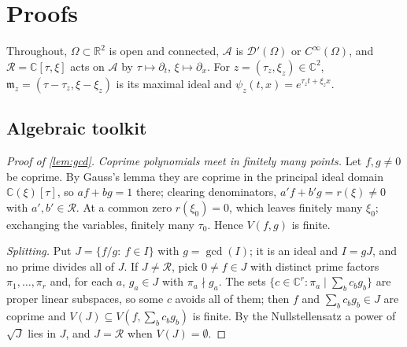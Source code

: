 \documentclass[11pt]{article}
\theoremstyle{plain}
\theoremstyle{definition}
\theoremstyle{remark}
\newcommand{\R}{\mathbb{R}}
\newcommand{\C}{\mathbb{C}}
\newcommand{\ring}{\mathcal{R}}            %
\DeclareMathOperator{\gcdop}{gcd}
\newcommand{\Var}{V}                        %
\begin{document}
\section{Proofs}\label{app:proofs}
Throughout, $\Omega\subset\R^2$ is open and connected, $\mathcal A$ is $\mathcal D'(\Omega)$ or $C^\infty(\Omega)$, and
$\ring=\C[\tau,\xi]$ acts on $\mathcal A$ by $\tau\mapsto\partial_t$, $\xi\mapsto\partial_x$. For $z=(\tau_z,\xi_z)\in\C^2$,
$\mathfrak m_z=(\tau-\tau_z,\xi-\xi_z)$ is its maximal ideal and $\psi_z(t,x)=e^{\tau_zt+\xi_zx}$.

\subsection{Algebraic toolkit}
\begin{proof}[Proof of \cref{lem:gcd}]
\emph{Coprime polynomials meet in finitely many points.} Let $f,g\ne0$ be coprime. By Gauss's lemma they are
coprime in the principal ideal domain $\C(\xi)[\tau]$, so $af+bg=1$ there; clearing denominators,
$a'f+b'g=r(\xi)\ne0$ with $a',b'\in\ring$. At a common zero $r(\xi_0)=0$, which leaves finitely many $\xi_0$;
exchanging the variables, finitely many $\tau_0$. Hence $\Var(f,g)$ is finite.

\emph{Splitting.} Put $J=\{f/g:\ f\in I\}$ with $g=\gcdop(I)$; it is an ideal and $I=gJ$, and no prime divides all
of $J$. If $J\ne\ring$, pick $0\ne f\in J$ with distinct prime factors $\pi_1,\dots,\pi_r$ and, for each $a$,
$g_a\in J$ with $\pi_a\nmid g_a$. The sets $\{c\in\C^r:\pi_a\mid\sum_bc_bg_b\}$ are proper linear subspaces, so some
$c$ avoids all of them; then $f$ and $\sum_bc_bg_b\in J$ are coprime and $\Var(J)\subseteq\Var(f,\sum_bc_bg_b)$ is
finite. By the Nullstellensatz a power of $\sqrt J$ lies in $J$, and $J=\ring$ when $\Var(J)=\emptyset$.
\end{proof}
\end{document}

